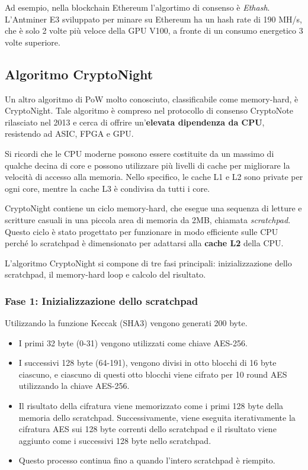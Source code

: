 Ad esempio, nella blockchain Ethereum l'algortimo di consenso è \textit{Ethash}. L'Antminer E3 sviluppato per minare su Ethereum ha un hash rate di 190 MH/s, che è solo 2 volte più veloce della GPU V100, a fronte di un consumo energetico 3 volte superiore.

\subsection{Algoritmo CryptoNight}
Un altro algoritmo di PoW molto conosciuto, classificabile come memory-hard, è CryptoNight. 
Tale algoritmo è compreso nel protocollo di consenso CryptoNote rilasciato nel 2013 e cerca di offrire un'\textbf{elevata dipendenza da CPU}, resistendo ad ASIC, FPGA e GPU.

Si ricordi che le CPU moderne possono essere costituite da un massimo di qualche decina di core e possono utilizzare più livelli di cache per migliorare la velocità di accesso alla memoria. 
Nello specifico, le cache L1 e L2 sono private per ogni core, mentre la cache L3 è condivisa da tutti i core. 

CryptoNight contiene un ciclo memory-hard, che esegue una sequenza di letture e scritture casuali in una piccola area di memoria da 2MB, chiamata \textit{scratchpad}. 
Questo ciclo è stato progettato per funzionare in modo efficiente sulle CPU perché lo scratchpad è dimensionato per adattarsi alla \textbf{cache L2} della CPU. 

L'algoritmo CryptoNight si compone di tre fasi principali: inizializzazione dello scratchpad, il memory-hard loop e calcolo del risultato.

\subsubsection*{Fase 1: Inizializzazione dello scratchpad}
Utilizzando la funzione Keccak (SHA3) vengono generati 200 byte. 
\begin{itemize}
    \item I primi 32 byte (0-31) vengono utilizzati come chiave AES-256. 
    \item I successivi 128 byte  (64-191), vengono divisi in otto blocchi di 16 byte ciascuno, e ciascuno di questi otto blocchi viene cifrato per 10 round AES utilizzando la chiave AES-256. 
    \item Il risultato della cifratura viene memorizzato come i primi 128 byte della memoria dello scratchpad. Successivamente, viene eseguita iterativamente la cifratura AES sui 128 byte correnti dello scratchpad e il risultato viene aggiunto come i successivi 128 byte nello scratchpad. 
    \item Questo processo continua fino a quando l'intero scratchpad è riempito.
\end{itemize}
    
